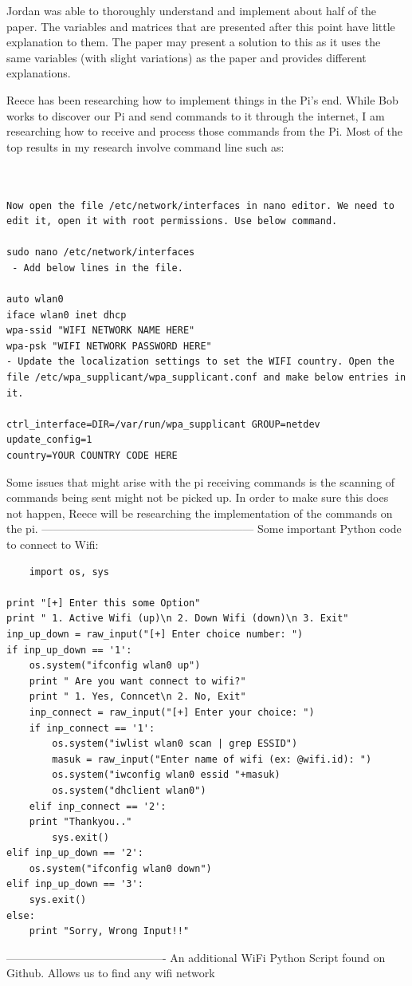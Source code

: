 \documentclass[fontsize=11pt, %
                             paper=letter, %
                             twoside, %
                             captions=tableheading,
                             index=totoc,
                             hyperref]{labbook}
\begin{document}
Jordan was able to thoroughly understand and implement about half of the \cite{Serrano1999} paper. The variables and matrices that are presented after this point have little explanation to them. The \cite{Kang2014} paper may present a solution to this as it uses the same variables (with slight variations) as the \cite{Serrano199} paper and provides different explanations. 

Reece has been researching how to implement things in the Pi's end. While Bob works to discover our Pi and send commands to it through the internet, I am researching how to receive and process those commands from the Pi. Most of the top results in my research involve command line such as: 
\begin{verbatim}
    

Now open the file /etc/network/interfaces in nano editor. We need to edit it, open it with root permissions. Use below command.

sudo nano /etc/network/interfaces
 - Add below lines in the file.

auto wlan0
iface wlan0 inet dhcp
wpa-ssid "WIFI NETWORK NAME HERE"
wpa-psk "WIFI NETWORK PASSWORD HERE"
- Update the localization settings to set the WIFI country. Open the file /etc/wpa_supplicant/wpa_supplicant.conf and make below entries in it.

ctrl_interface=DIR=/var/run/wpa_supplicant GROUP=netdev
update_config=1
country=YOUR COUNTRY CODE HERE 
\end{verbatim}
Some issues that might arise with the pi receiving commands is the scanning of commands being sent might not be picked up. In order to make sure this does not happen, Reece will be researching the implementation of the commands on the pi.
---------------------------------------------------------
Some important Python code to connect to Wifi: 
\begin{verbatim}
    import os, sys

print "[+] Enter this some Option"
print " 1. Active Wifi (up)\n 2. Down Wifi (down)\n 3. Exit"
inp_up_down = raw_input("[+] Enter choice number: ")
if inp_up_down == '1':
    os.system("ifconfig wlan0 up")
    print " Are you want connect to wifi?"
    print " 1. Yes, Conncet\n 2. No, Exit"
    inp_connect = raw_input("[+] Enter your choice: ")
    if inp_connect == '1':
        os.system("iwlist wlan0 scan | grep ESSID")
        masuk = raw_input("Enter name of wifi (ex: @wifi.id): ")
        os.system("iwconfig wlan0 essid "+masuk)
        os.system("dhclient wlan0")
    elif inp_connect == '2':
    print "Thankyou.."
        sys.exit()
elif inp_up_down == '2':
    os.system("ifconfig wlan0 down")
elif inp_up_down == '3':
    sys.exit()
else:
    print "Sorry, Wrong Input!!"

\end{verbatim}
-------------------------------------------
An additional WiFi Python Script found on Github. Allows us to find any wifi network
\end{document}
